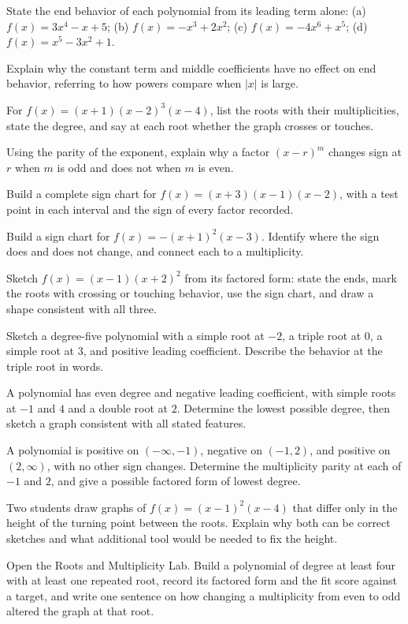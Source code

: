 \documentclass[12pt]{book}
\begin{document}
\begin{exercises}
\item State the end behavior of each polynomial from its leading term alone:
(a) $f(x)=3x^4-x+5$; (b) $f(x)=-x^3+2x^2$; (c) $f(x)=-4x^6+x^5$;
(d) $f(x)=x^5-3x^2+1$.

\item Explain why the constant term and middle coefficients have no effect on end
behavior, referring to how powers compare when $|x|$ is large.

\item For $f(x)=(x+1)(x-2)^3(x-4)$, list the roots with their multiplicities, state
the degree, and say at each root whether the graph crosses or touches.

\item Using the parity of the exponent, explain why a factor $(x-r)^m$ changes sign
at $r$ when $m$ is odd and does not when $m$ is even.

\item Build a complete sign chart for $f(x)=(x+3)(x-1)(x-2)$, with a test point in
each interval and the sign of every factor recorded.

\item Build a sign chart for $f(x)=-(x+1)^2(x-3)$. Identify where the sign does and
does not change, and connect each to a multiplicity.

\item Sketch $f(x)=(x-1)(x+2)^2$ from its factored form: state the ends, mark the
roots with crossing or touching behavior, use the sign chart, and draw a shape
consistent with all three.

\item Sketch a degree-five polynomial with a simple root at $-2$, a triple root at
$0$, a simple root at $3$, and positive leading coefficient. Describe the behavior at
the triple root in words.

\item A polynomial has even degree and negative leading coefficient, with simple
roots at $-1$ and $4$ and a double root at $2$. Determine the lowest possible degree,
then sketch a graph consistent with all stated features.

\item A polynomial is positive on $(-\infty,-1)$, negative on $(-1,2)$, and positive
on $(2,\infty)$, with no other sign changes. Determine the multiplicity parity at
each of $-1$ and $2$, and give a possible factored form of lowest degree.

\item Two students draw graphs of $f(x)=(x-1)^2(x-4)$ that differ only in the height
of the turning point between the roots. Explain why both can be correct sketches and
what additional tool would be needed to fix the height.

\item Open the Roots and Multiplicity Lab. Build a polynomial of degree at least four
with at least one repeated root, record its factored form and the fit score against a
target, and write one sentence on how changing a multiplicity from even to odd
altered the graph at that root.
\end{exercises}
\end{document}
